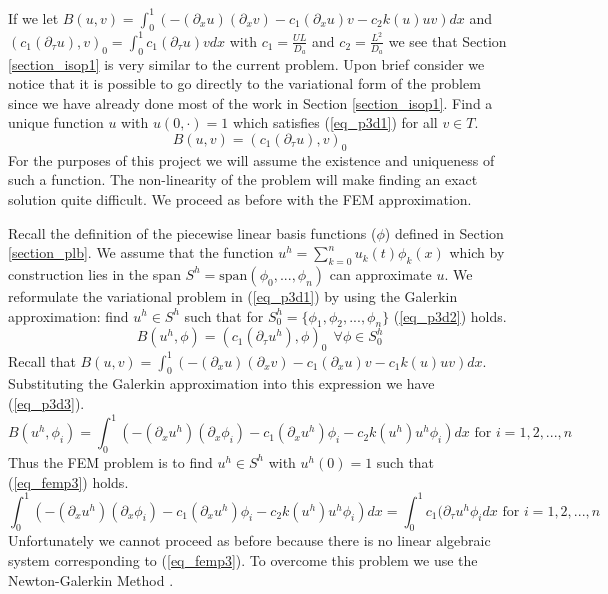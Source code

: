 \documentclass[11pt,fleqn]{article}
\theoremstyle{defstyle}
\begin{document}
If we let $B(u, v) = \int_0^1 \left(-(\partial_xu)(\partial_xv) - c_1(\partial_xu)v - c_2k(u)uv\right)dx$ and $(c_1(\partial_{\tau}u),v)_0 = \int^1_0 c_1(\partial_{\tau}u)v dx$ with $c_1 = \frac{UL}{D_a}$ and $c_2 = \frac{L^2}{D_a}$ we see that Section \ref{section_isop1} is very similar to the current problem. Upon brief consider we notice that it is possible to go directly to the variational form of the problem since we have already done most of the work in Section \ref{section_isop1}.  Find a unique function $u$ with $u(0, \cdot)=1$ which satisfies (\ref{eq_p3d1}) for all $v \in T$.
\begin{equation}
B(u, v) = (c_1(\partial_{\tau}u),v)_0
\label{eq_p3d1}
\end{equation}
For the purposes of this project we will assume the existence and uniqueness of such a function. The non-linearity of the problem will make finding an exact solution quite difficult. We proceed as before with the FEM approximation.

Recall the definition of the piecewise linear basis functions ($\phi$) defined in Section \ref{section_plb}. We assume that the function $u^h =\sum^n_{k=0} u_k(t) \phi_k(x)$ which by construction lies in the span $S^h=\text{span}(\phi_0,...,\phi_n)$ can approximate $u$. We reformulate the variational problem in (\ref{eq_p3d1}) by using the Galerkin approximation: find $u^h \in S^h$ such that for $S^h_0=\{\phi_1, \phi_2,...,\phi_n \}$ (\ref{eq_p3d2}) holds.
\begin{equation}
B(u^h, \phi) = (c_1(\partial_{\tau}u^h),\phi)_0~~\forall \phi \in S^h_0
\label{eq_p3d2}
\end{equation} 
Recall that $B(u, v) = \int_0^1 \left(-(\partial_xu)(\partial_xv) - c_1(\partial_xu)v - c_1k(u)uv\right)dx$. Substituting the Galerkin approximation into this expression we have (\ref{eq_p3d3}).
\begin{equation}
B(u^h, \phi_i) = \int_0^1 \left(-(\partial_xu^h)(\partial_x\phi_i) - c_1(\partial_xu^h)\phi_i - c_2k(u^h)u^h\phi_i\right)dx \text{ for } i=1,2,...,n
\label{eq_p3d3}
\end{equation}
Thus the FEM problem is to find $u^h \in S^h$ with $u^h(0)=1$ such that (\ref{eq_femp3}) holds.
\begin{equation}
\int_0^1 \left(-(\partial_xu^h)(\partial_x\phi_i) -c_1(\partial_xu^h)\phi_i - c_2k(u^h)u^h\phi_i\right)dx = \int_0^1 c_1(\partial_{\tau}u^h\phi_i dx \text{ for } i=1,2,...,n
\label{eq_femp3}
\end{equation}
Unfortunately we cannot proceed as before because there is no linear algebraic system corresponding to (\ref{eq_femp3}). To overcome this problem we use the Newton-Galerkin Method \cite{larson}.
\end{document}
